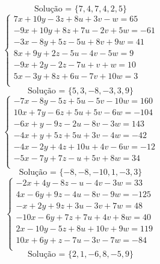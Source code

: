 \documentclass[12pt,oneside,a4paper]{article}
\begin{document}
\begin{equation*}
\text{Solução = }\{7,4,7,4,2,5\}
\end{equation*}
\vspace{\baselineskip}
\begin{equation*}
\begin{cases}
7x+10y-3z+8u+3v-w=65 \\
-9x+10y+8z+7u-2v+5w=-61 \\
-3x-8y+5z-5u+8v+9w=41 \\
8x+9y+2z-5u-4v-5w=9 \\
-9x+2y-2z-7u+v+w=10 \\
5x-3y+8z+6u-7v+10w=3 \\
\end{cases}
\end{equation*}
\begin{equation*}
\text{Solução = }\{5,3,-8,-3,3,9\}
\end{equation*}
\vspace{\baselineskip}
\begin{equation*}
\begin{cases}
-7x-8y-5z+5u-5v-10w=160 \\
10x+7y-6z+5u+5v-6w=-104 \\
-6x+y-9z-2u-8v-3w=143 \\
-4x+y+5z+5u+3v-4w=-42 \\
-4x-2y+4z+10u+4v-6w=-12 \\
-5x-7y+7z-u+5v+8w=34 \\
\end{cases}
\end{equation*}
\begin{equation*}
\text{Solução = }\{-8,-8,-10,1,-3,3\}
\end{equation*}
\vspace{\baselineskip}
\begin{equation*}
\begin{cases}
-2x+4y-8z-u-4v-3w=33 \\
4x-6y+9z-4u-8v-9w=-125 \\
-x+2y+9z+3u-3v+7w=48 \\
-10x-6y+7z+7u+4v+8w=40 \\
2x-10y-5z+8u+10v+9w=119 \\
10x+6y+z-7u-3v-7w=-84 \\
\end{cases}
\end{equation*}
\begin{equation*}
\text{Solução = }\{2,1,-6,8,-5,9\}
\end{equation*}
\end{document}
